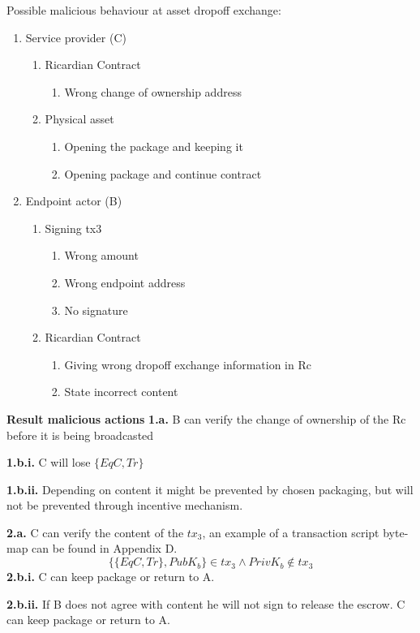 Possible malicious behaviour at asset dropoff exchange:
\begin{enumerate}
  \item Service provider (C)
  \begin{enumerate}
    \item Ricardian Contract
    \begin{enumerate}
      \item Wrong change of ownership address
    \end{enumerate}
    \item Physical asset
    \begin{enumerate}
      \item Opening the package and keeping it
      \item Opening package and continue contract
    \end{enumerate}
  \end{enumerate}
  \item Endpoint actor (B)
  \begin{enumerate}
    \item Signing tx3
    \begin{enumerate}
      \item Wrong amount
      \item Wrong endpoint address
      \item No signature
    \end{enumerate}
    \item Ricardian Contract
    \begin{enumerate}
      \item Giving wrong dropoff exchange information in Rc
      \item State incorrect content
    \end{enumerate}
  \end{enumerate}
\end{enumerate}

\bigbreak
\noindent\textbf{Result malicious actions}
\bigbreak
\noindent\textbf{1.a.} B can verify the change of ownership of the Rc before it is being broadcasted \par
\noindent\textbf{1.b.i.} C will lose $\{EqC, Tr\}$ \par
\noindent\textbf{1.b.ii.} Depending on content it might be prevented by chosen packaging, but will not be prevented through incentive mechanism. \par

\noindent\textbf{2.a.} C can verify the content of the $tx_3$, an example of a transaction script byte-map can be found in Appendix D.
\[\{\{EqC, Tr\}, PubK_b\}\in tx_3 \land PrivK_b \notin tx_3\]
\noindent\textbf{2.b.i.} C can keep package or return to A.\par
\noindent\textbf{2.b.ii.} If B does not agree with content he will not sign to release the escrow. C can keep package or return to A.\par

